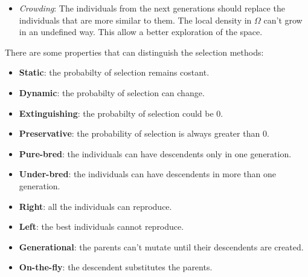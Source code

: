 \documentclass{article}
\begin{document}
\begin{itemize}
    \item \textit{Crowding}: The individuals from the next generations should replace the
          individuals that are more similar to them. The local density in $\Omega$ can't grow
          in an undefined way. This allow a better exploration of the space.
\end{itemize}

There are some properties that can distinguish the selection methods:
\begin{itemize}
    \item \textbf{Static}: the probabilty of selection remains costant.
    \item \textbf{Dynamic}: the probabilty of selection can change.
    \item \textbf{Extinguishing}: the probabilty of selection could be 0.
    \item \textbf{Preservative}: the probability of selection is always greater than 0.
    \item \textbf{Pure-bred}: the individuals can have descendents only in one generation.
    \item \textbf{Under-bred}: the individuals can have descendents in more than one generation.
    \item \textbf{Right}: all the individuals can reproduce.
    \item \textbf{Left}: the best individuals cannot reproduce.
    \item \textbf{Generational}: the parents can't mutate until their descendents are created.
    \item \textbf{On-the-fly}: the descendent substitutes the parents.
\end{itemize}
\end{document}
